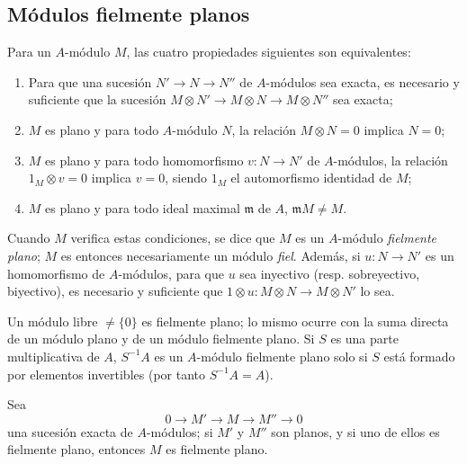 \subsection{Módulos fielmente planos}
\label{subsection:0.6.4-fr}

\begin{env}[6.4.1]
\label{0.6.4.1-fr}
Para un $A$-módulo $M$, las cuatro propiedades siguientes son equivalentes:
\begin{enumerate}
  \item[$a)$] Para que una sucesión $N'\to N\to N''$ de $A$-módulos sea exacta,
    es necesario y suficiente que la sucesión
    $M\otimes N'\to M\otimes N\to M\otimes N''$ sea exacta;
  \item[$b)$] $M$ es plano y para todo $A$-módulo $N$, la relación
    $M\otimes N=0$ implica $N=0$;
  \item[$c)$] $M$ es plano y para todo homomorfismo $v:N\to N'$ de
    $A$-módulos, la relación $1_M\otimes v=0$ implica $v=0$, siendo $1_M$
    el automorfismo identidad de $M$;
  \item[$d)$] $M$ es plano y para todo ideal maximal $\mathfrak{m}$ de
    $A$, $\mathfrak{m}M\neq M$.
\end{enumerate}

Cuando $M$ verifica estas condiciones, se dice que $M$ es un $A$-módulo
\emph{fielmente plano}; $M$ es entonces necesariamente un módulo
\emph{fiel}. Además, si $u:N\to N'$ es un homomorfismo de $A$-módulos,
para que $u$ sea inyectivo (resp. sobreyectivo, biyectivo), es necesario y suficiente
que $1\otimes u:M\otimes N\to M\otimes N'$ lo sea.
\end{env}


\begin{env}[6.4.2]
\label{0.6.4.2-fr}
Un módulo libre $\neq\{0\}$ es fielmente plano; lo mismo ocurre con la
suma directa de un módulo plano y de un módulo fielmente plano. Si $S$ es
una parte multiplicativa de $A$, $S^{-1}A$ es un $A$-módulo fielmente
plano solo si $S$ está formado por elementos invertibles (por tanto $S^{-1}A=A$).
\end{env}

\begin{env}[6.4.3]
\label{0.6.4.3-fr}
Sea
\[
  0\longrightarrow M'\longrightarrow M\longrightarrow M''\longrightarrow 0
\]
una sucesión exacta de $A$-módulos; si $M'$ y $M''$ son planos, y si uno
de ellos es fielmente plano, entonces $M$ es fielmente plano.
\end{env}

